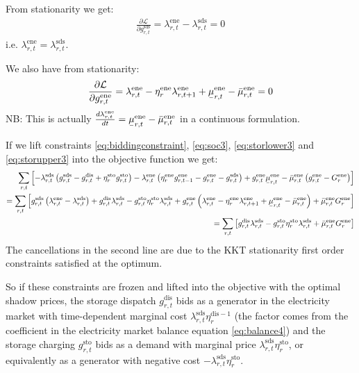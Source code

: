\documentclass[final,3p,times]{elsarticle}
\newcommand{\ubar}[1]{\text{\b{$#1$}}}
\def\d{\partial}
\def\cL{\mathcal{L}}
\begin{document}
From stationarity we get:
\begin{align}
\frac{\d \cL}{\d g^{\textrm{sds}}_{r,t}} = \lambda^{\textrm{ene}}_{r,t} - \lambda^{\textrm{sds}}_{r,t} = 0
\end{align}
i.e. $\lambda^{\textrm{ene}}_{r,t} = \lambda^{\textrm{sds}}_{r,t}$.

We also have from stationarity:
\begin{align}
\frac{\d \cL}{\d g^{\textrm{ene}}_{r,t}} = \lambda^{\textrm{ene}}_{r,t} - \eta^{\textrm{ene}}_r\lambda^{\textrm{ene}}_{r,t+1} + \ubar{\mu}^{\textrm{ene}}_{r,t} -  \bar{\mu}^{\textrm{ene}}_{r,t} = 0
\end{align}
NB: This is actually $\frac{d \lambda^{\textrm{ene}}_{r,t}}{dt} = \ubar{\mu}^{\textrm{ene}}_{r,t} - \bar{\mu}^{\textrm{ene}}_{r,t}$ in a continuous formulation.

If we lift constraints \eqref{eq:biddingconstraint}, \eqref{eq:soc3}, \eqref{eq:storlower3} and \eqref{eq:storupper3} into the objective function we get:
\begin{align}
  \sum_{r,t} \left[ - \lambda^{\textrm{sds}}_{r,t} \left(  g^{\textrm{sds}}_{r,t} - g^{\textrm{dis}}_{r,t} + \eta^{\textrm{sto}}_r g^{\textrm{sto}}_{r,t}\right) - \lambda^{\textrm{ene}}_{r,t} \left(\eta^{\textrm{ene}}_r g^{\textrm{ene}}_{r,t-1} - g^{\textrm{ene}}_{r,t} - g^{\textrm{sds}}_{r,t}\right)  + g^{\textrm{ene}}_{r,t}\ubar{\mu}^{\textrm{ene}}_{r,t} -  \bar{\mu}^{\textrm{ene}}_{r,t}  \left(    g^{\textrm{ene}}_{r,t} - G^{\textrm{ene}}_r \right) \right] \\
  =   \sum_{r,t} \left[  g^{\textrm{sds}}_{r,t} \left(\lambda^{\textrm{ene}}_{r,t} - \lambda^{\textrm{sds}}_{r,t} \right)  +g^{\textrm{dis}}_{r,t}\lambda^{\textrm{sds}}_{r,t}  -  g^{\textrm{sto}}_{r,t} \eta^{\textrm{sto}}_r \lambda^{\textrm{sds}}_{r,t} + g^{\textrm{ene}}_{r,t}\left(\lambda^{\textrm{ene}}_{r,t} -\eta^{\textrm{ene}}_r \lambda^{\textrm{ene}}_{r,t+1}  + \ubar{\mu}^{\textrm{ene}}_{r,t} -  \bar{\mu}^{\textrm{ene}}_{r,t} \right) + \bar{\mu}^{\textrm{ene}}_{r,t} G^{\textrm{ene}}_r \right] \\
   =   \sum_{r,t} \left[ g^{\textrm{dis}}_{r,t}\lambda^{\textrm{sds}}_{r,t}  -  g^{\textrm{sto}}_{r,t} \eta^{\textrm{sto}}_r \lambda^{\textrm{sds}}_{r,t} + \bar{\mu}^{\textrm{ene}}_{r,t} G^{\textrm{ene}}_r \right]
\end{align}
The cancellations in the second line are due to the KKT stationarity first order constraints satisfied at the optimum.

So if these constraints are frozen and lifted into the objective with the optimal shadow prices, the storage dispatch $g^{\textrm{dis}}_{r,t}$ bids as a generator in the electricity market with time-dependent marginal cost $\lambda^{\textrm{sds}}_{r,t}\eta^{\textrm{dis} -1}_r $ (the factor comes from the coefficient in the electricity market balance equation \eqref{eq:balance4}) and the storage charging $g^{\textrm{sto}}_{r,t}$ bids as a demand with marginal price $\lambda^{\textrm{sds}}_{r,t} \eta^{\textrm{sto}}_r$, or equivalently as a generator with negative cost $-\lambda^{\textrm{sds}}_{r,t} \eta^{\textrm{sto}}_r$.
\end{document}
